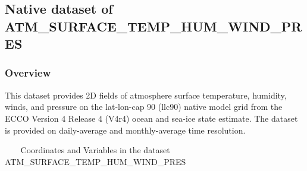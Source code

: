 \subsection{Native dataset of ATM\_SURFACE\_TEMP\_HUM\_WIND\_PRES}
\newp
\subsubsection{Overview}
This dataset provides 2D fields of atmosphere surface temperature, humidity, winds, and pressure on the lat-lon-cap 90 (llc90) native model grid from the ECCO Version 4 Release 4 (V4r4) ocean and sea-ice state estimate. The dataset is provided on daily-average and monthly-average time resolution. 
\begin{longtable}{|m{}|m{}|m{}|}
\caption{Coordinates and Variables in the dataset ATM\_SURFACE\_TEMP\_HUM\_WIND\_PRES}
\label{tab:table-<xarray.Dataset> Size: 8MB
Dimensions:    (time: 1, tile: 13, j: 90, i: 90, i_g: 90, j_g: 90, nv: 2, nb: 4)
Coordinates: (12/13)
  * time       (time) datetime64[ns] 8B 2017-12-29T12:00:00
  * tile       (tile) int32 52B 0 1 2 3 4 5 6 7 8 9 10 11 12
  * j          (j) int32 360B 0 1 2 3 4 5 6 7 8 9 ... 81 82 83 84 85 86 87 88 89
  * i          (i) int32 360B 0 1 2 3 4 5 6 7 8 9 ... 81 82 83 84 85 86 87 88 89
    XC         (tile, j, i) float32 421kB ...
    YC         (tile, j, i) float32 421kB ...
    ...         ...
    XG         (tile, j_g, i_g) float32 421kB ...
    YG         (tile, j_g, i_g) float32 421kB ...
  * j_g        (j_g) int32 360B 0 1 2 3 4 5 6 7 8 ... 81 82 83 84 85 86 87 88 89
    time_bnds  (time, nv) datetime64[ns] 16B ...
    XC_bnds    (tile, j, i, nb) float32 2MB ...
    YC_bnds    (tile, j, i, nb) float32 2MB ...
Dimensions without coordinates: nv, nb
Data variables:
    EXFatemp   (time, tile, j, i) float32 421kB ...
    EXFaqh     (time, tile, j, i) float32 421kB ...
    EXFuwind   (time, tile, j, i) float32 421kB ...
    EXFvwind   (time, tile, j, i) float32 421kB ...
    EXFwspee   (time, tile, j, i) float32 421kB ...
    EXFpress   (time, tile, j, i) float32 421kB ...
Attributes: (12/57)
    acknowledgement:              This research was carried out by the Jet Pr...
    author:                       Ian Fenty and Ou Wang
    cdm_data_type:                Grid
    comment:                      Fields provided on the curvilinear lat-lon-...
    Conventions:                  CF-1.8, ACDD-1.3
    coordinates_comment:          Note: the global 'coordinates' attribute de...
    ...                           ...
}
\end{longtable}
